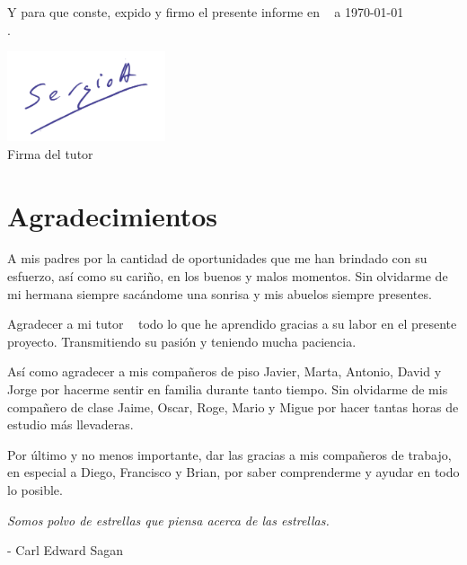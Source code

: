Y para que conste, expido y firmo el presente informe en \ciudad ~ a \today\\.

\vspace{2cm}

\vspace{1cm}
\begin{center}
\includegraphics[width=0.35\textwidth]{../images/firmaZerjillo3.png}\\

Firma del tutor
\end{center}


\chapter*{Agradecimientos}
\thispagestyle{empty}



A mis padres por la cantidad de oportunidades que me han brindado con su esfuerzo, así como su cariño, en los buenos y malos momentos. Sin olvidarme de mi hermana siempre sacándome una sonrisa y mis abuelos siempre presentes. 

\bigskip
Agradecer a mi tutor \tutor ~ todo lo que he aprendido gracias a su labor en el presente proyecto. Transmitiendo su pasión y teniendo mucha paciencia.

\bigskip
Así como agradecer a mis compañeros de piso Javier, Marta, Antonio, David y Jorge por hacerme sentir en familia durante tanto tiempo. Sin olvidarme de mis compañero de clase Jaime, Oscar, Roge, Mario y Migue por hacer tantas horas de estudio más llevaderas. 

\bigskip
Por último y no menos importante, dar las gracias a mis compañeros de trabajo, en especial a Diego, Francisco y Brian, por saber comprenderme y ayudar en todo lo posible. 


\vspace{6cm}
\begin{center}
	\begin{minipage}{0.9\linewidth}
		\vspace{5pt}%
		{\textit{
			Somos polvo de estrellas que piensa acerca de las estrellas.
		}}
		\begin{flushright}
			  \small - Carl Edward Sagan
		\end{flushright}
		\vspace{5pt}%
	\end{minipage}
\end{center}






